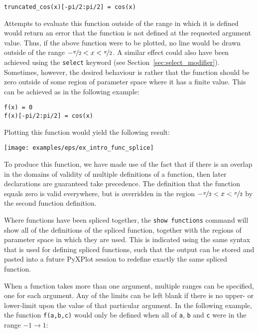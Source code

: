 \begin{verbatim}
truncated_cos(x)[-pi/2:pi/2] = cos(x)
\end{verbatim}

\noindent Attempts to evaluate this function outside of the range in which it
is defined would return an error that the function is not defined at the
requested argument value. Thus, if the above function were to be plotted, no
line would be drawn outside of the range
$-\nicefrac{\pi}{2}<x<\nicefrac{\pi}{2}$. A similar effect could also have been
achieved using the {\tt select} keyword (see
Section~\ref{sec:select_modifier}). Sometimes, however, the desired behaviour
is rather that the function should be zero outside of some region of parameter
space where it has a finite value. This can be achieved as in the following
example:

\begin{verbatim}
f(x) = 0
f(x)[-pi/2:pi/2] = cos(x)
\end{verbatim}

\noindent Plotting this function would yield the following result:

\begin{center}
\texttt{[image: examples/eps/ex\_intro\_func\_splice]}
\end{center}

\noindent To produce this function, we have made use of the fact that if there
is an overlap in the domains of validity of multiple definitions of a function,
then later declarations are guaranteed take precedence. The definition that the
function equals zero is valid everywhere, but is overridden in the region
$-\nicefrac{\pi}{2}<x<\nicefrac{\pi}{2}$ by the second function definition.

Where functions have been spliced together, the {\tt show functions} command
will show all of the definitions of the spliced function, together with the
regions of parameter space in which they are used. This is indicated using the
same syntax that is used for defining spliced functions, such that the output can
be stored and pasted into a future PyXPlot session to redefine exactly the same
spliced function.

When a function takes more than one argument, multiple ranges can be specified,
one for each argument. Any of the limits can be left blank if there is no
upper- or lower-limit upon the value of that particular argument. In the
following example, the function {\tt f(a,b,c)} would only be defined when all
of {\tt a}, {\tt b} and {\tt c} were in the range $-1 \to 1$:

